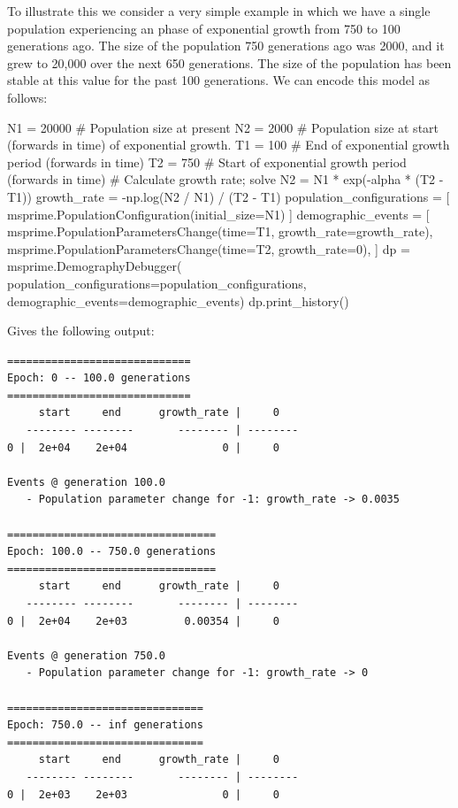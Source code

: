 \documentclass[graybox]{svmult}
\begin{document}
To illustrate this we consider a very simple example in which we have a
single population experiencing an phase of exponential growth from 750
to 100 generations ago. The size of the population 750 generations ago
was 2000, and it grew to 20,000 over the next 650 generations. The size
of the population has been stable at this value for the past 100
generations. We can encode this model as follows:

\begin{pythoncode}
N1 = 20000  # Population size at present
N2 = 2000   # Population size at start (forwards in time) of exponential growth.
T1 = 100    # End of exponential growth period (forwards in time)
T2 = 750    # Start of exponential growth period (forwards in time)
# Calculate growth rate; solve N2 = N1 * exp(-alpha * (T2 - T1))
growth_rate = -np.log(N2 / N1) / (T2 - T1)
population_configurations = [
    msprime.PopulationConfiguration(initial_size=N1)
]
demographic_events = [
    msprime.PopulationParametersChange(time=T1, growth_rate=growth_rate),
    msprime.PopulationParametersChange(time=T2, growth_rate=0),
]
dp = msprime.DemographyDebugger(
    population_configurations=population_configurations,
    demographic_events=demographic_events)
dp.print_history()
\end{pythoncode}

Gives the following output:
\begin{footnotesize}
\begin{verbatim}
=============================
Epoch: 0 -- 100.0 generations
=============================
     start     end      growth_rate |     0
   -------- --------       -------- | --------
0 |  2e+04    2e+04               0 |     0

Events @ generation 100.0
   - Population parameter change for -1: growth_rate -> 0.0035

=================================
Epoch: 100.0 -- 750.0 generations
=================================
     start     end      growth_rate |     0
   -------- --------       -------- | --------
0 |  2e+04    2e+03         0.00354 |     0

Events @ generation 750.0
   - Population parameter change for -1: growth_rate -> 0

===============================
Epoch: 750.0 -- inf generations
===============================
     start     end      growth_rate |     0
   -------- --------       -------- | --------
0 |  2e+03    2e+03               0 |     0

\end{verbatim}
\end{footnotesize}
\end{document}
